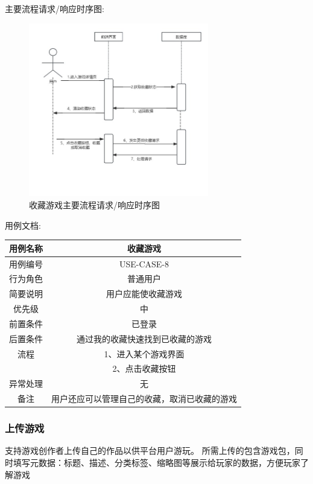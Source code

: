 \documentclass[12pt]{ctexart} %
\begin{document}
主要流程请求/响应时序图:
\begin{figure}[h]
  \centering
  \includegraphics[width=0.7\textwidth]{yongli8.jpg}
  \caption{收藏游戏主要流程请求/响应时序图}
\end{figure}
用例文档:

\begin{tabular}{|c|c|}
  \hline
  用例名称& 收藏游戏\\
  \hline
  用例编号 & USE-CASE-8\\
  \hline
  行为角色 & 普通用户\\
  \hline
  简要说明 & 用户应能使收藏游戏\\
  \hline
  优先级 & 中\\
  \hline
  前置条件 & 已登录\\
  \hline
  后置条件 & 通过我的收藏快速找到已收藏的游戏\\
  \hline
  流程 & 1、进入某个游戏界面\\
      &  2、点击收藏按钮\\
  \hline
  异常处理 & 无\\
  \hline
  备注 & 用户还应可以管理自己的收藏，取消已收藏的游戏\\
  \hline
\end{tabular}

\subsubsection{上传游戏}
支持游戏创作者上传自己的作品以供平台用户游玩。
所需上传的包含游戏包，同时填写元数据：标题、描述、分类标签、缩略图等展示给玩家的数据，方便玩家了解游戏
\end{document}
